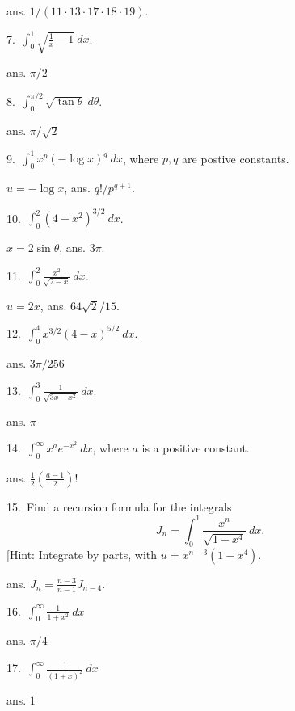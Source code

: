 \documentclass[12pt]{article}
\theoremstyle{definition}
\theoremstyle{remark}
\theoremstyle{definition}
\begin{document}
ans. $1/(11\cdot 13\cdot 17\cdot 18\cdot 19)$. 

7.\ $\int_0^1\sqrt{\frac{1}{x}-1}\ dx$.

ans. $\pi/2$

8.\ $\int_0^{\pi/2}\sqrt{\tan\theta}\ d\theta$. 

ans. $\pi/\sqrt{2}$

9.\ $\int_0^1x^p(-\log x)^q\ dx$, where $p,q$ are postive constants.

$u=-\log x$, ans. $q!/p^{q+1}$.

10.\ $\int_0^2(4-x^2)^{3/2}\ dx$. 

$x=2\sin\theta$, ans. $3\pi$.

11.\ $\int_0^2\frac{x^2}{\sqrt{2-x}}\ dx$.

$u=2x$, ans. $64\sqrt{2}/15$.

12.\ $\int_0^4x^{3/2}(4-x)^{5/2}\ dx$.

ans. $3\pi/256$

13.\ $\int_0^3\frac{1}{\sqrt{3x-x^2}}\ dx$.

ans. $\pi$

14.\ $\int_0^\infty x^a e^{-x^2}\ dx$, where $a$ is a positive constant.

ans. $\frac{1}{2}(\frac{a-1}{2})!$

15.\ Find a recursion formula for the integrals 
\[J_n=\int_0^1 \frac{x^n}{\sqrt{1-x^4}}\ dx.\]
[Hint: Integrate by parts, with $u=x^{n-3}(1-x^4)$.

ans. $J_n=\frac{n-3}{n-1} J_{n-4}$. 


16.\ $\int_0^\infty\frac{1}{1+x^2}\ dx$

ans. $\pi/4$

17.\ $\int_0^\infty \frac{1}{(1+x)^2}\ dx$

ans. $1$
\end{document}
